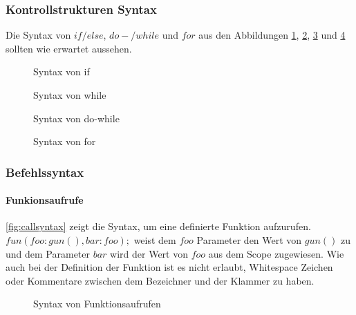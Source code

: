     \subsubsection{Kontrollstrukturen Syntax}
    \label{sssec:Kontrollstrukturen Syntax}
      Die Syntax von \myMIn$if/else$, \myMIn$do-/while$ und \myMIn$for$ aus den Abbildungen \ref{fig:ifsyntax}, \ref{fig:whilesyntax}, \ref{fig:dowhilesyntax} und \ref{fig:forsyntax} sollten wie erwartet aussehen.
      \begin{figure}[H]
        \centering
        \caption{Syntax von if}
        \label{fig:ifsyntax}
      \end{figure}

      \begin{figure}[H]
        \centering
        \caption{Syntax von while}
        \label{fig:whilesyntax}
      \end{figure}

      \begin{figure}[H]
        \centering
        \caption{Syntax von do-while}
        \label{fig:dowhilesyntax}
      \end{figure}

      \begin{figure}[H]
        \centering
        \caption{Syntax von for}
        \label{fig:forsyntax}
      \end{figure}

    \subsubsection{Befehlssyntax}
    \label{sssec:Befehlssyntax}
      \paragraph{Funkionsaufrufe}
        \autoref{fig:callsyntax} zeigt die Syntax, um eine definierte Funktion aufzurufen. \myMIn$fun(foo:gun(), bar:foo);$ weist dem \myMIn$foo$ Parameter den Wert von \myMIn$gun()$ zu und dem Parameter \myMIn$bar$ wird der Wert von \myMIn$foo$ aus dem Scope zugewiesen. Wie auch bei der Definition der Funktion ist es nicht erlaubt, Whitespace Zeichen oder Kommentare zwischen dem Bezeichner und der Klammer zu haben.
        \begin{figure}[H]
          \centering
          \caption{Syntax von Funktionsaufrufen}
          \label{fig:callsyntax}
        \end{figure}

